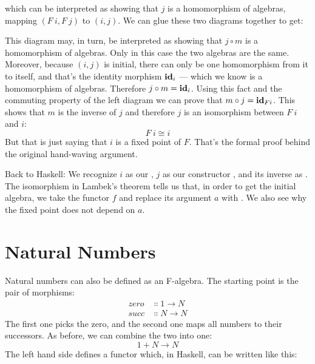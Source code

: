 \noindent
which can be interpreted as showing that $j$ is a homomorphism of
algebras, mapping $(F\ i, F\ j)$ to $(i, j)$. We can
glue these two diagrams together to get:

\begin{figure}[H]
\centering
{}
\end{figure}

\noindent
This diagram may, in turn, be interpreted as showing that
$j \circ m$ is a homomorphism of algebras. Only in this case the
two algebras are the same. Moreover, because $(i, j)$ is
initial, there can only be one homomorphism from it to itself, and
that's the identity morphism $\mathbf{id}_i$ --- which we know is a
homomorphism of algebras. Therefore $j \circ m = \mathbf{id}_i$. Using this
fact and the commuting property of the left diagram we can prove that
$m \circ j = \mathbf{id}_{Fi}$. This shows that $m$ is the inverse of
$j$ and therefore $j$ is an isomorphism between
$F\ i$ and $i$:
\[F\ i \cong i\]
But that is just saying that $i$ is a fixed point of $F$.
That's the formal proof behind the original hand-waving argument.

Back to Haskell: We recognize $i$ as our ,
$j$ as our constructor , and its inverse as
. The isomorphism in Lambek's theorem tells us that, in
order to get the initial algebra, we take the functor $f$ and
replace its argument $a$ with . We also see why
the fixed point does not depend on $a$.

\section{Natural Numbers}

Natural numbers can also be defined as an F-algebra. The starting point
is the pair of morphisms:
\begin{align*}
zero &\Colon 1 \to N \\
succ &\Colon N \to N
\end{align*}
The first one picks the zero, and the second one maps all numbers to
their successors. As before, we can combine the two into one:
\[1 + N \to N\]
The left hand side defines a functor which, in Haskell, can be written
like this:

